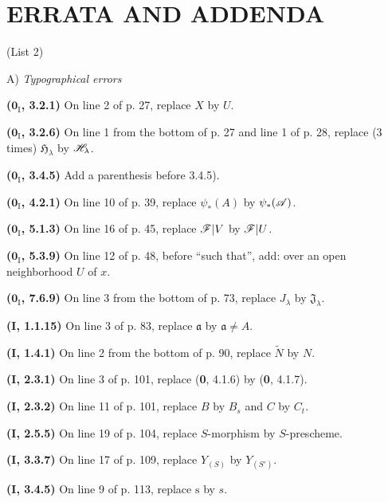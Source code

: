 \clearpage
\thispagestyle{empty}
\null
\clearpage

\section*{ERRATA AND ADDENDA}
\begin{center}
(List 2)

\medskip
A) \emph{Typographical errors}
\end{center}

\noindent\textbf{($\mathbf{0}_{\mathrm I}$, 3.2.1)} On line 2 of p. 27, replace $X$
by $U$.

\noindent\textbf{($\mathbf{0}_{\mathrm I}$, 3.2.6)} On line 1 from the bottom of p.
27 and line 1 of p. 28, replace (3 times) $\mathfrak H_\lambda$ by
$\mathscr{H}_\lambda$.

\noindent\textbf{($\mathbf{0}_{\mathrm I}$, 3.4.5)} Add a parenthesis before 3.4.5).

\noindent\textbf{($\mathbf{0}_{\mathrm I}$, 4.2.1)} On line 10 of p. 39, replace
$\psi_*(A)$ by $\psi_*(\mathscr{A})$.

\noindent\textbf{($\mathbf{0}_{\mathrm I}$, 5.1.3)} On line 16 of p. 45, replace
$\mathscr{F}|V$ by $\mathscr{F}|U$.

\noindent\textbf{($\mathbf{0}_{\mathrm I}$, 5.3.9)} On line 12 of p. 48, before
``such that'', add: over an open neighborhood $U$ of $x$.

\noindent\textbf{($\mathbf{0}_{\mathrm I}$, 7.6.9)} On line 3 from the bottom of p.
73, replace $J_\lambda$ by $\mathfrak J_\lambda$.

\noindent\textbf{(\textbf{I}, 1.1.15)} On line 3 of p. 83, replace $\mathfrak a$ by
$\mathfrak a\ne A$.

\noindent\textbf{(\textbf{I}, 1.4.1)} On line 2 from the bottom of p. 90, replace
$\widetilde N$ by $N$.

\noindent\textbf{(\textbf{I}, 2.3.1)} On line 3 of p. 101, replace (\textbf{0},
4.1.6) by (\textbf{0}, 4.1.7).

\noindent\textbf{(\textbf{I}, 2.3.2)} On line 11 of p. 101, replace $B$ by $B_s$ and
$C$ by $C_t$.

\noindent\textbf{(\textbf{I}, 2.5.5)} On line 19 of p. 104, replace $S$-morphism by
$S$-prescheme.

\noindent\textbf{(\textbf{I}, 3.3.7)} On line 17 of p. 109, replace $Y_{(S)}$ by
$Y_{(S')}$.

\noindent\textbf{(\textbf{I}, 3.4.5)} On line 9 of p. 113, replace $\mathrm s$ by $s$.

